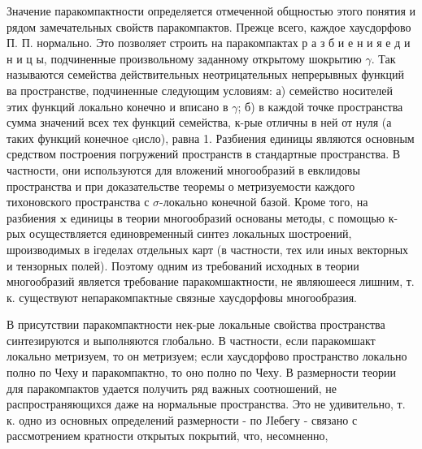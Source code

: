 \documentclass[10pt]{article}
\begin{document}
Значение паракомпактности определяется отмеченной общностью этого понятия и рядом замечательных свойств паракомпактов. Прежце всего, каждое хаусдорфово П. П. нормально. Это позволяет строить на паракомпактах р а з б и е н и я е д и н и ц ы, подчиненные произвольному заданному открытому шокрытию $\gamma$. Так называются семейства действительных неотрицательных непрерывных функций ва пространстве, подчиненные следующим условиям: а) семейство носителей этих функций локально конечно и вписано в $\gamma$; б) в каждой точке пространства сумма значений всех тех функций семейства, к-рые отличны в ней от нуля (а таких функций конечное qисло), равна 1. Разбиения единицы являются основным средством построения погружений пространств в стандартные пространства. В частности, они используются для вложений многообразий в евклидовы пространства и при доказательстве теоремы о метризуемости каждого тихоновского пространства с $\sigma$-локально конечной базой. Кроме того, на разбиения $\mathbf{x}$ единицы в теории многообразий основаны методы, с помощью к-рых осуществляется единовременный синтез локальных шостроений, шроизводимых в ігеделах отдельных карт (в частности, тех или иных векторных и тензорных полей). Поэтому одним из требований исходных в теории многообразий является требование паракомшактности, не являюшееся лишним, т. к. существуют непаракомпактные связные хаусдорфовы многообразия.



В присутствии паракомпактности нек-рые локальные свойства пространства синтезируются и выполняются глобально. В частности, если паракомшакт локально метризуем, то он метризуем; если хаусдорфово пространство локально полно по Чеху и паракомпактно, то оно полно по Чеху. В размерности теории для паракомпактов удается получить ряд важных соотношений, не распространяющихся даже на нормальные пространства. Это не удивительно, т. к. одно из основных определений размерности - по ЈІебегу - связано с рассмотрением кратности открытых покрытий, что, несомненно,
\end{document}
